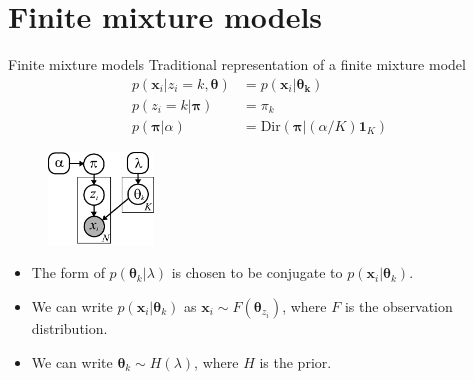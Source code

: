\documentclass[10pt,mathserif]{beamer}
\begin{document}
\section{Finite mixture models}
\begin{frame}{Finite mixture models}
Traditional representation of a finite mixture model
\begin{equation*}
    \begin{split}
    p(\bm{x}_i|z_i = k, \bm{\theta}) & = p(\bm{x}_i|\bm{\theta_k})\\
    p(z_i = k|\bm{\pi}) & = \pi_k\\
    p(\bm{\pi}|\alpha) & = \text{Dir}(\bm{\pi}|(\alpha/K)\bm{1}_K)
    \end{split}
\end{equation*}

\begin{figure}[h]
\centering
\includegraphics[width=0.25\textwidth]{sudderth-finiteMixIndGraph}
\end{figure}

\begin{itemize}
    \item The form of $p(\bm{\theta}_k|\lambda)$ is chosen to be conjugate to $p(\bm{x}_i|\bm{\theta}_k)$. 
    \item We can write $p(\bm{x}_i|\bm{\theta}_k)$ as $\bm{x}_i \sim F(\bm{\theta}_{z_i})$, where $F$ is the observation distribution. 
    \item We can write $\bm{\theta}_k \sim H(\lambda)$, where $H$ is the prior.
\end{itemize}
\end{frame}
\end{document}
